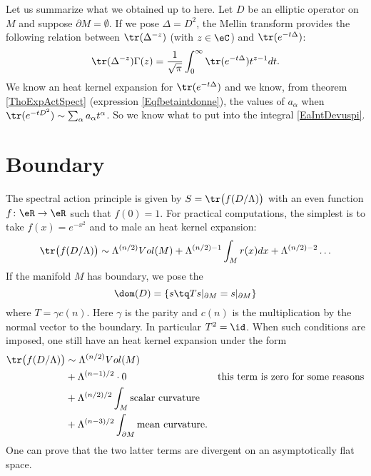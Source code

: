 Let us summarize what we obtained up to here. Let $D$ be an elliptic operator on $M$ and suppose $\partial M=\emptyset$. If we pose $\Delta=D^2$, the Mellin transform provides the following relation between $\tr(\Delta^{-z})$ (with $z\in\eC$) and $\tr( e^{-t\Delta})$:
\begin{equation}		\label{EaIntDevuspi}
\tr(\Delta^{-z})\Gamma(z)=\frac{1}{ \sqrt{\pi} }\int_0^{\infty}\tr( e^{-t\Delta})t^{z-1}dt.
\end{equation}
We know an heat kernel expansion for $\tr( e^{-t\Delta})$ and we know, from theorem \ref{ThoExpActSpect} (expression \eqref{Eqfbetaintdonne}), the values of $a_{\alpha}$ when $\tr( e^{-tD^2})\sim\sum_{\alpha}a_{\alpha}t^{\alpha}$. So we know what to put into the integral \ref{EaIntDevuspi}.

\section{Boundary}

The spectral action principle is given by $S=\tr\big( f(D/\Lambda) \big)$ with an even function $f\colon \eR\to \eR$ such that $f(0)=1$. For practical computations, the simplest is to take $f(x)= e^{-x^2}$ and to male an heat kernel expansion:
\[ 
  \tr\big( f(D/\Lambda) \big)\sim \Lambda^{(n/2)}Vol(M)+\Lambda^{(n/2)-1}\int_Mr(x)dx+\Lambda^{(n/2)-2}\ldots
\]
If the manifold $M$ has boundary, we pose the 
\begin{equation}
\dom(D)=\{ s\tq Ts|_{\partial M}=s|_{\partial M} \}
\end{equation}
where $T=\gamma c(n)$. Here $\gamma$ is the parity and $c(n)$ is the multiplication by the normal vector to the boundary. In particular $T^2=\id$. When such conditions are imposed, one still have an heat kernel expansion under the form
\begin{align}
\tr\big( f(D/\Lambda) \big)&\sim \Lambda^{(n/2)}Vol(M)\\
				&+\Lambda^{(n-1)/2}\cdot 0&\textrm{this term is zero for some reasons}\\
				&+\Lambda^{(n/2)/2}\int_M \textrm{scalar curvature}\\
				&+\Lambda^{(n-3)/2}\int_{\partial M}\textrm{mean curvature}.
\end{align}
One can prove that the two latter terms are divergent on an asymptotically flat space.
